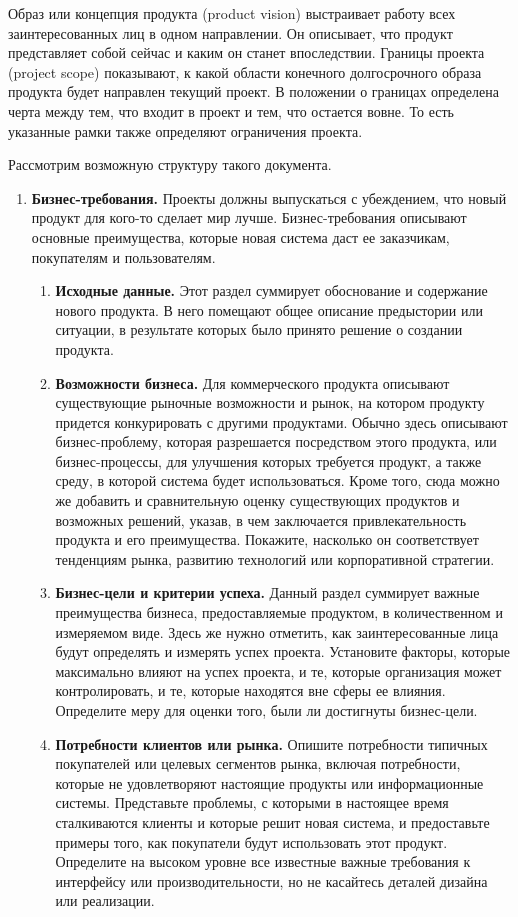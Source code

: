 \documentclass{../../text-style}
\begin{document}
Образ или концепция продукта (product vision) выстраивает работу всех заинтересованных лиц в одном направлении. Он описывает, что продукт представляет собой сейчас и каким он станет впоследствии. Границы проекта (project scope) показывают, к какой области конечного долгосрочного образа продукта будет направлен текущий проект. В положении о границах определена черта между тем, что входит в проект и тем, что остается вовне. То есть указанные рамки также определяют ограничения проекта.

Рассмотрим возможную структуру такого документа.

\begin{enumerate}
    \item \textbf{Бизнес-требования.} Проекты должны выпускаться с убеждением, что новый продукт для кого-то сделает мир лучше. Бизнес-требования описывают основные преимущества, которые новая система даст ее заказчикам, покупателям и пользователям.
    \begin{enumerate}
        \item \textbf{Исходные данные.} Этот раздел суммирует обоснование и содержание нового продукта. В него помещают общее описание предыстории или ситуации, в результате которых было принято решение о создании продукта.
        \item \textbf{Возможности бизнеса.} Для коммерческого продукта описывают существующие рыночные возможности и рынок, на котором продукту придется конкурировать с другими продуктами. Обычно здесь описывают бизнес-проблему, которая разрешается посредством этого продукта, или бизнес-процессы, для улучшения которых требуется продукт, а также среду, в которой система будет использоваться. Кроме того, сюда можно же добавить и сравнительную оценку существующих продуктов и возможных решений, указав, в чем заключается привлекательность продукта и его преимущества. Покажите, насколько он соответствует тенденциям рынка, развитию технологий или корпоративной стратегии.
        \item \textbf{Бизнес-цели и критерии успеха.} Данный раздел суммирует важные преимущества бизнеса, предоставляемые продуктом, в количественном и измеряемом виде. Здесь же нужно отметить, как заинтересованные лица будут определять и измерять успех проекта. Установите факторы, которые максимально влияют на успех проекта, и те, которые организация может контролировать, и те, которые находятся вне сферы ее влияния. Определите меру для оценки того, были ли достигнуты бизнес-цели.
        \item \textbf{Потребности клиентов или рынка.} Опишите потребности типичных покупателей или целевых сегментов рынка, включая потребности, которые не удовлетворяют настоящие продукты или информационные системы. Представьте проблемы, с которыми в настоящее время сталкиваются клиенты и которые решит новая система, и предоставьте примеры того, как покупатели будут использовать этот продукт. Определите на высоком уровне все известные важные требования к интерфейсу или производительности, но не касайтесь деталей дизайна или реализации.

\end{enumerate}
\end{enumerate}
\end{document}
